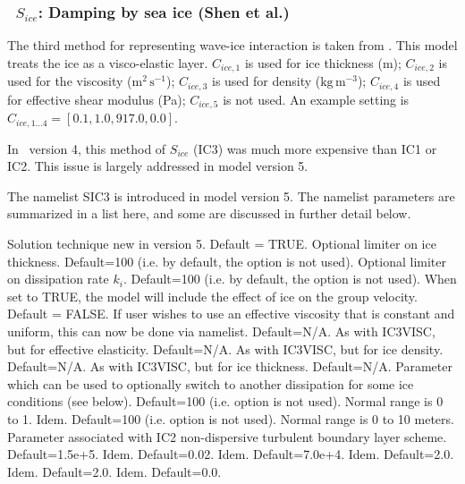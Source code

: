 \vsssub
\subsubsection{~$S_{ice}$: Damping by sea ice (Shen et al.)} \label{sec:ICE3}
\vsssub


\noindent
The third method for representing wave-ice interaction is taken from\linebreak
\cite{art:WS10}. This model treats the ice as a visco-elastic
layer. ${C_{ice,1}}$ is used for ice thickness (m); ${C_{ice,2}}$ is used for
the viscosity ($\mathrm{m^2\,s^{-1}}$); ${C_{ice,3}}$ is used for density
($\mathrm{kg\,m^{-3}}$); ${C_{ice,4}}$ is used for effective shear modulus
(Pa); ${C_{ice,5}}$ is not used. An example setting is 
${C_{ice,1...4}}=[0.1, 1.0, 917.0, 0.0]$.

In \ws\ version 4, this method of $S_{ice}$ ({\code IC3}) was much more expensive than {\code IC1} or {\code IC2}. This issue is largely addressed in model version 5.

The namelist {\F SIC3} is introduced in model version 5. The namelist parameters are summarized in a list here, and some are discussed in further detail below.

\begin{clist}
 {Solution technique new in version 5. Default = {\code TRUE}.}
 {Optional limiter on ice thickness. Default=100 (i.e. by default, the option is not used).}
 {Optional limiter on dissipation rate ${k_i}$. Default=100 (i.e. by default, the option is not used).}
 {When set to {\code TRUE}, the model will include the effect of ice on the group velocity. Default = {\code FALSE}.}
 {If user wishes to use an effective viscosity that is constant and uniform, this can now be done via namelist. Default=N/A.}
 {As with {\code IC3VISC}, but for effective elasticity. Default=N/A.}
 {As with {\code IC3VISC}, but for ice density. Default=N/A.}
 {As with {\code IC3VISC}, but for ice thickness. Default=N/A.}
 {Parameter which can be used to optionally switch to another dissipation for some ice conditions (see below). Default=100 (i.e. option is not used). Normal range is 0 to 1.}
 {Idem. Default=100 (i.e. option is not used). Normal range is 0 to 10 meters.}        
 {Parameter associated with IC2 non-dispersive turbulent boundary layer scheme. Default=1.5e+5.}
 {Idem. Default=0.02.}
 {Idem. Default=7.0e+4.}
 {Idem. Default=2.0.}
 {Idem. Default=2.0.}          
 {Idem. Default=0.0.}
\end{clist}

